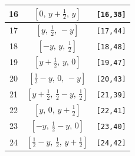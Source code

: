 \documentclass[fleqn,8pt]{jsarticle}
\begin{document}
\begin{longtable}{ccc}
16 & $\left[ 0,\, y + \frac{1}{2},\, y \right]$ & {\tt [16,38]} \\ \hline
17 & $\left[ y,\, \frac{1}{2},\, - y \right]$ & {\tt [17,44]} \\ \hline
18 & $\left[ - y,\, y,\, \frac{1}{2} \right]$ & {\tt [18,48]} \\ \hline
19 & $\left[ y + \frac{1}{2},\, y,\, 0 \right]$ & {\tt [19,47]} \\ \hline
20 & $\left[ \frac{1}{2} - y,\, 0,\, - y \right]$ & {\tt [20,43]} \\ \hline
21 & $\left[ y + \frac{1}{2},\, \frac{1}{2} - y,\, \frac{1}{2} \right]$ & {\tt [21,39]} \\ \hline
22 & $\left[ y,\, 0,\, y + \frac{1}{2} \right]$ & {\tt [22,41]} \\ \hline
23 & $\left[ - y,\, \frac{1}{2} - y,\, 0 \right]$ & {\tt [23,40]} \\ \hline
24 & $\left[ \frac{1}{2} - y,\, \frac{1}{2},\, y + \frac{1}{2} \right]$ & {\tt [24,42]} \\
\end{longtable}
\renewcommand{\arraystretch}{1.2}
\end{document}

